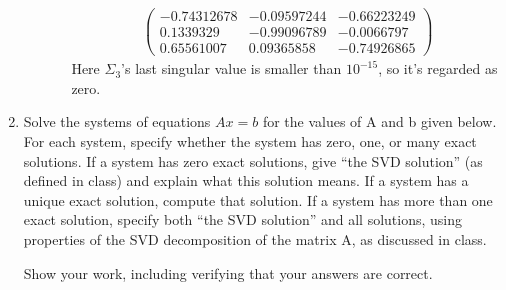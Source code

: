 \documentclass[conference,onecolumn]{IEEEtran}
\begin{document}
\begin{enumerate}[label=\arabic{enumi}.]
\begin{enumerate}
\begin{enumerate}
\begin{align*}
                                  \begin{pmatrix}
                                      -0.74312678 & -0.09597244 & -0.66223249 \\
                                      0.1339329   & -0.99096789 & -0.0066797  \\
                                      0.65561007  & 0.09365858  & -0.74926865
                                  \end{pmatrix}
                              \end{align*}
                              Here $\Sigma_3$'s last singular value is smaller than $10^{-15}$, so it's regarded as zero.
                    \end{enumerate}
          \end{enumerate}

          \clearpage
    \item Solve the systems of equations $Ax = b$ for the values of A and b given below.
          For each system, specify whether the system has zero, one, or many exact solutions.
          If a system has zero exact solutions, give “the SVD solution” (as defined in class) and explain what this solution means.
          If a system has a unique exact solution, compute that solution.
          If a system has more than one exact solution, specify both “the SVD solution” and all solutions, using properties of the SVD decomposition of the matrix A, as discussed in class.

          Show your work, including verifying that your answers are correct.


\end{enumerate}
\end{document}
